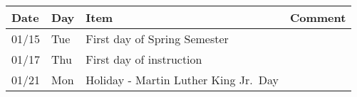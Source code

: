 \begin{longtable}[]{@{}llll@{}}
\toprule
\begin{minipage}[b]{0.05\columnwidth}\raggedright
Date\strut
\end{minipage} & \begin{minipage}[b]{0.03\columnwidth}\raggedright
Day\strut
\end{minipage} & \begin{minipage}[b]{0.43\columnwidth}\raggedright
Item\strut
\end{minipage} & \begin{minipage}[b]{0.38\columnwidth}\raggedright
Comment\strut
\end{minipage}\tabularnewline
\midrule
\endhead
\begin{minipage}[t]{0.05\columnwidth}\raggedright
01/15\strut
\end{minipage} & \begin{minipage}[t]{0.03\columnwidth}\raggedright
Tue\strut
\end{minipage} & \begin{minipage}[t]{0.43\columnwidth}\raggedright
First day of Spring Semester\strut
\end{minipage} & \begin{minipage}[t]{0.38\columnwidth}\raggedright
\strut
\end{minipage}\tabularnewline
\begin{minipage}[t]{0.05\columnwidth}\raggedright
01/17\strut
\end{minipage} & \begin{minipage}[t]{0.03\columnwidth}\raggedright
Thu\strut
\end{minipage} & \begin{minipage}[t]{0.43\columnwidth}\raggedright
First day of instruction\strut
\end{minipage} & \begin{minipage}[t]{0.38\columnwidth}\raggedright
\strut
\end{minipage}\tabularnewline
\begin{minipage}[t]{0.05\columnwidth}\raggedright
01/21\strut
\end{minipage} & \begin{minipage}[t]{0.03\columnwidth}\raggedright
Mon\strut
\end{minipage} & \begin{minipage}[t]{0.43\columnwidth}\raggedright
Holiday - Martin Luther King Jr.~Day\strut
\end{minipage} & \begin{minipage}[t]{0.38\columnwidth}\raggedright

\end{minipage}
\end{longtable}
